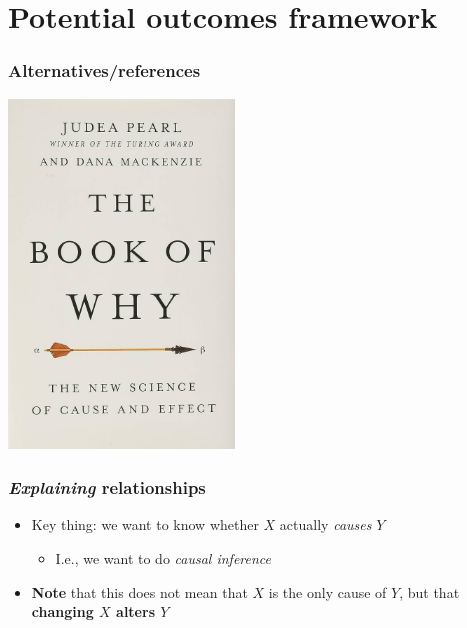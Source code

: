 \documentclass[aspectratio=43]{beamer}
\begin{document}
%
%
%

\section{Potential outcomes framework}

\begin{frame}
\frametitle{Alternatives/references}
\centering

\includegraphics[width = 0.45\textwidth]{../img/the_book_of_why}

\end{frame}

\begin{frame}
\frametitle{\textit{Explaining} relationships}
\centering

\begin{itemize}
  \item Key thing: we want to know whether $X$ actually \textit{causes} $Y$
  \begin{itemize}
    \item I.e., we want to do \textit{causal inference}
  \end{itemize}
  \item \textbf{Note} that this does not mean that $X$ is the only cause of $Y$, but that \textbf{changing $X$ alters $Y$}
\end{itemize}

\end{frame}
\end{document}

